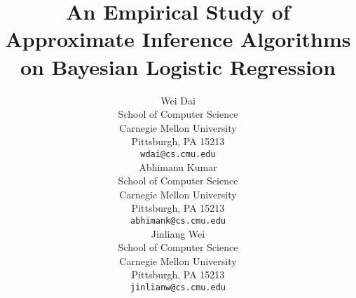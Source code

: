 \documentclass{article}
\title{An Empirical Study of Approximate Inference Algorithms on Bayesian
Logistic Regression}
\author{
Wei Dai \\
School of Computer Science \\
Carnegie Mellon University\\
Pittsburgh, PA 15213\\
\texttt{wdai@cs.cmu.edu}\\
\And
Abhimanu Kumar \\
School of Computer Science \\
Carnegie Mellon University\\
Pittsburgh, PA 15213\\
\texttt{abhimank@cs.cmu.edu}\\
\And
Jinliang Wei \\
School of Computer Science \\
Carnegie Mellon University\\
Pittsburgh, PA 15213\\
\texttt{jinlianw@cs.cmu.edu}\\
}
\begin{document}
\maketitle

\begin{abstract}
\end{abstract}

\setcounter{page}{1}






\end{document}
